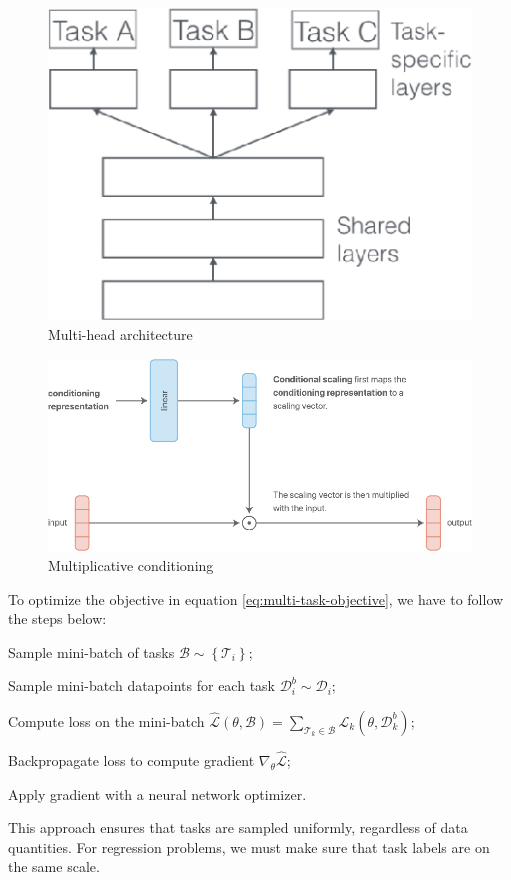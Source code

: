 \begin{minipage}{.4\linewidth}
    \begin{figure}[H]
        \centering
        \includegraphics[width=0.7\linewidth]{images/mm-multitask-sol6}
        \caption[Multi-head architecture]{Multi-head architecture}
        \label{fig:mm-multitask-sol6}
    \end{figure}
\end{minipage}
\begin{minipage}{.6\linewidth}
    \begin{figure}[H]
        \centering
        \includegraphics[width=0.8\linewidth]{images/mm-multitask-sol7}
        \caption[Multiplicative conditioning]{Multiplicative conditioning}
        \label{fig:mm-multitask-sol7}
    \end{figure}
\end{minipage}

To optimize the objective in equation \ref{eq:multi-task-objective}, we have to follow the steps below:
\begin{myenum}
    \item Sample mini-batch of tasks $\mathcal{B} \sim \left\{\mathcal{T}_i\right\}$;
    \item Sample mini-batch datapoints for each task $\mathcal{D}_i^b \sim \mathcal{D}_i$;
    \item Compute loss on the mini-batch $\hat{\mathcal{L}}(\theta, \mathcal{B}) = \sum_{\mathcal{T}_k \in \mathcal{B}} \mathcal{L}_k (\theta, \mathcal{D}_k^b)$;
    \item Backpropagate loss to compute gradient $\nabla_\theta \hat{\mathcal{L}}$;
    \item Apply gradient with a neural network optimizer.
\end{myenum}
This approach ensures that tasks are sampled uniformly, regardless of data quantities. For regression problems, we must make sure that task labels are on the same scale.

